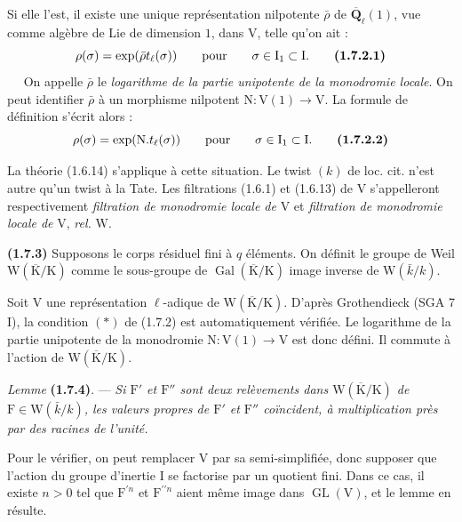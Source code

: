 \documentclass[11pt,leqno]{article}
\newcommand{\Page}[1]{\ifvmode\noindent\else\unskip\ \fi{\footnotesize\textcolor{gray}{[p.\,#1]}}\ \ignorespaces}
\begin{document}
Si elle l’est, il existe une unique représentation nilpotente \(\bar{\rho}\) de \(\overline{\mathbf{Q}}_\ell(1)\), vue comme algèbre de Lie de dimension \(1\), dans \(\mathrm{V}\), telle qu’on ait :
\[
\rho(\sigma)=\exp(\bar{\rho}t_\ell(\sigma))
\qquad\text{pour}\qquad\sigma\in\mathrm{I}_1\subset\mathrm{I}.
\tag*{\textbf{(1.7.2.1)}}
\]
\Page{171}
On appelle \(\bar{\rho}\) le \textit{logarithme de la partie unipotente de la monodromie locale}. On peut identifier \(\bar{\rho}\) à un morphisme nilpotent \(\mathrm{N}:\mathrm{V}(1)\to\mathrm{V}\). La formule de définition s’écrit alors :
\[
\rho(\sigma)=\exp(\mathrm{N}.t_\ell(\sigma))
\qquad\text{pour}\qquad\sigma\in\mathrm{I}_1\subset\mathrm{I}.
\tag*{\textbf{(1.7.2.2)}}
\]

La théorie (1.6.14) s’applique à cette situation. Le twist \((k)\) de loc. cit. n’est autre qu’un twist à la Tate. Les filtrations (1.6.1) et (1.6.13) de \(\mathrm{V}\) s’appelleront respectivement \textit{filtration de monodromie locale de} \(\mathrm{V}\) et \textit{filtration de monodromie locale de} \(\mathrm{V}\), \textit{rel.} \(\mathrm{W}\).

\textbf{(1.7.3)} Supposons le corps résiduel fini à \(q\) éléments. On définit le groupe de Weil \(\mathrm{W}(\overline{\mathrm{K}}/\mathrm{K})\) comme le sous-groupe de \(\operatorname{Gal}(\overline{\mathrm{K}}/\mathrm{K})\) image inverse de \(\mathrm{W}(\bar{k}/k)\).

Soit \(\mathrm{V}\) une représentation \(\ell\)-adique de \(\mathrm{W}(\overline{\mathrm{K}}/\mathrm{K})\). D’après Grothendieck (SGA 7 I), la condition \((*)\) de (1.7.2) est automatiquement vérifiée. Le logarithme de la partie unipotente de la monodromie \(\mathrm{N}:\mathrm{V}(1)\to\mathrm{V}\) est donc défini. Il commute à l’action de \(\mathrm{W}(\overline{\mathrm{K}}/\mathrm{K})\).

\textit{Lemme} \textbf{(1.7.4)}. — \textit{Si \(\mathrm{F}'\) et \(\mathrm{F}''\) sont deux relèvements dans \(\mathrm{W}(\overline{\mathrm{K}}/\mathrm{K})\) de \(\mathrm{F}\in\mathrm{W}(\bar{k}/k)\), les valeurs propres de \(\mathrm{F}'\) et \(\mathrm{F}''\) coïncident, à multiplication près par des racines de l’unité.}

Pour le vérifier, on peut remplacer \(\mathrm{V}\) par sa semi-simplifiée, donc supposer que l’action du groupe d’inertie \(\mathrm{I}\) se factorise par un quotient fini. Dans ce cas, il existe \(n>0\) tel que \(\mathrm{F}^{\prime n}\) et \(\mathrm{F}^{\prime\prime n}\) aient même image dans \(\operatorname{GL}(\mathrm{V})\), et le lemme en résulte.
\end{document}
